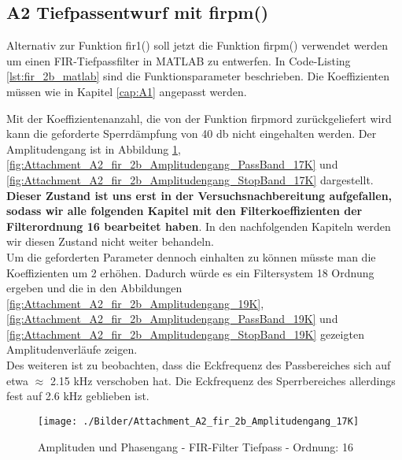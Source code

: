 \newpage
\subsection{A2 Tiefpassentwurf mit firpm()}


\noindent Alternativ zur Funktion fir1() soll jetzt die Funktion firpm() verwendet werden um einen FIR-Tiefpassfilter in MATLAB zu entwerfen. In Code-Listing \ref{lst:fir_2b_matlab} sind die Funktionsparameter beschrieben. Die Koeffizienten müssen wie in Kapitel \ref{cap:A1} angepasst werden.





\noindent Mit der Koeffizientenanzahl, die von der Funktion firpmord zurückgeliefert wird kann die geforderte Sperrdämpfung von 40 db nicht eingehalten werden. Der Amplitudengang ist in Abbildung \ref{fig:Attachment_A2_fir_2b_Amplitudengang_17K}, \ref{fig:Attachment_A2_fir_2b_Amplitudengang_PassBand_17K} und \ref{fig:Attachment_A2_fir_2b_Amplitudengang_StopBand_17K} dargestellt. \textbf{Dieser Zustand ist uns erst in der Versuchsnachbereitung aufgefallen, sodass wir alle folgenden Kapitel mit den Filterkoeffizienten der Filterordnung 16 bearbeitet haben}. In den nachfolgenden Kapiteln werden wir diesen Zustand nicht weiter behandeln.\\
Um die geforderten Parameter dennoch einhalten zu können müsste man die Koeffizienten um 2 erhöhen. Dadurch würde es ein Filtersystem 18 Ordnung ergeben und die in den Abbildungen \ref{fig:Attachment_A2_fir_2b_Amplitudengang_19K}, \ref{fig:Attachment_A2_fir_2b_Amplitudengang_PassBand_19K} und \ref{fig:Attachment_A2_fir_2b_Amplitudengang_StopBand_19K} gezeigten Amplitudenverläufe zeigen.\\
Des weiteren ist zu beobachten, dass die Eckfrequenz des Passbereiches sich auf etwa $\approx$ 2.15 kHz verschoben hat. Die Eckfrequenz des Sperrbereiches allerdings fest auf 2.6 kHz geblieben ist.

\begin{figure}[H]
\centering
\texttt{[image: ./Bilder/Attachment\_A2\_fir\_2b\_Amplitudengang\_17K]}
\caption{Amplituden und Phasengang - FIR-Filter Tiefpass - Ordnung: 16}
\label{fig:Attachment_A2_fir_2b_Amplitudengang_17K}
\end{figure}



